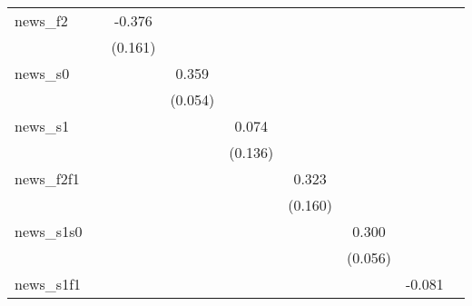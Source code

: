{\begin{tabular}{l*{8}{c}}
news\_f2     &                     &      -0.376\sym{**} &                     &                     &                     &                     &                     &                     \\
            &                     &     (0.161)         &                     &                     &                     &                     &                     &                     \\
\addlinespace
news\_s0     &                     &                     &       0.359\sym{***}&                     &                     &                     &                     &                     \\
            &                     &                     &     (0.054)         &                     &                     &                     &                     &                     \\
\addlinespace
news\_s1     &                     &                     &                     &       0.074         &                     &                     &                     &                     \\
            &                     &                     &                     &     (0.136)         &                     &                     &                     &                     \\
\addlinespace
news\_f2f1   &                     &                     &                     &                     &       0.323\sym{*}  &                     &                     &                     \\
            &                     &                     &                     &                     &     (0.160)         &                     &                     &                     \\
\addlinespace
news\_s1s0   &                     &                     &                     &                     &                     &       0.300\sym{***}&                     &                     \\
            &                     &                     &                     &                     &                     &     (0.056)         &                     &                     \\
\addlinespace
news\_s1f1   &                     &                     &                     &                     &                     &                     &      -0.081         &                     \\

\end{tabular}}
